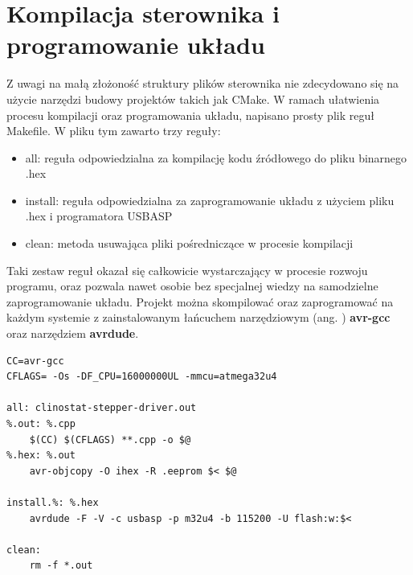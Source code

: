 \section{Kompilacja sterownika i programowanie układu}

Z uwagi na małą złożoność struktury plików sterownika nie zdecydowano się na użycie narzędzi budowy projektów takich jak CMake. W ramach ułatwienia procesu kompilacji oraz programowania układu, napisano prosty plik reguł Makefile. W pliku tym zawarto trzy reguły:
\begin{itemize}
	\item all: reguła odpowiedzialna za kompilację kodu źródłowego do pliku binarnego .hex
	\item install: reguła odpowiedzialna za zaprogramowanie układu z użyciem pliku .hex i programatora USBASP
	\item clean: metoda usuwająca pliki pośredniczące w procesie kompilacji
\end{itemize}
Taki zestaw reguł okazał się całkowicie wystarczający w procesie rozwoju programu, oraz pozwala nawet osobie bez specjalnej wiedzy na samodzielne zaprogramowanie układu. Projekt można skompilować oraz zaprogramować na każdym systemie z zainstalowanym łańcuchem narzędziowym (ang. ) \textbf{avr-gcc} oraz narzędziem \textbf{avrdude}.

\begin{lstlisting}[caption=Makefile sterownika.]
CC=avr-gcc
CFLAGS= -Os -DF_CPU=16000000UL -mmcu=atmega32u4

all: clinostat-stepper-driver.out
%.out: %.cpp
	$(CC) $(CFLAGS) **.cpp -o $@
%.hex: %.out
	avr-objcopy -O ihex -R .eeprom $< $@

install.%: %.hex
	avrdude -F -V -c usbasp -p m32u4 -b 115200 -U flash:w:$<

clean:
	rm -f *.out
\end{lstlisting}